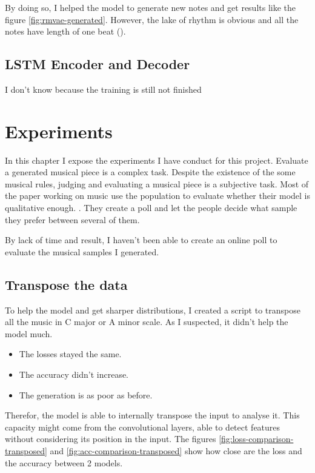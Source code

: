 \documentclass[12pt]{report}
\begin{document}
By doing so, I helped the model to generate new notes and get results like the figure \ref{fig:rmvae-generated}.
However, the lake of rhythm is obvious and all the notes have length of one beat (\musQuarter).


\section{LSTM Encoder and Decoder}

I don't know because the training is still not finished


\chapter{Experiments}

In this chapter I expose the experiments I have conduct for this project.
Evaluate a generated musical piece is a complex task.
Despite the existence of the some musical rules, judging and evaluating a musical piece is a subjective task.
Most of the paper working on music use the population to evaluate whether their model is qualitative enough. \cite{huang_counterpoint_2017, hadjeres_deepbach:_2016, huang_music_2018, liang_automatic_2017, huang_bach_2019}.
They create a poll and let the people decide what sample they prefer between several of them.

By lack of time and result, I haven't been able to create an online poll to evaluate the musical samples I generated.

\section{Transpose the data}

To help the model and get sharper distributions, I created a script to transpose all the music in C major or A minor scale.
As I suspected, it didn't help the model much.
\begin{itemize}
    \item The losses stayed the same.
    \item The accuracy didn't increase.
    \item The generation is as poor as before.
\end{itemize}
Therefor, the model is able to internally transpose the input to analyse it.
This capacity might come from the convolutional layers, able to detect features without considering its position in the input.
The figures \ref{fig:loss-comparison-transposed} and \ref{fig:acc-comparison-transposed} show how close are the loss and the accuracy between 2 models.
\end{document}
